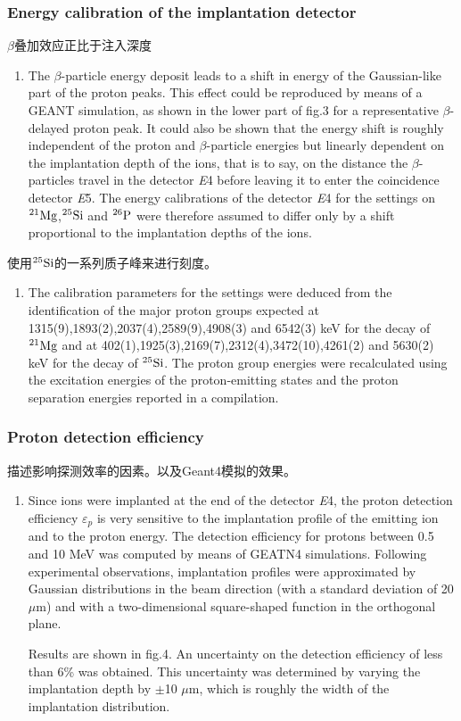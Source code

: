 \documentclass[UTF8]{ctexart}
\begin{document}
\subsubsection{Energy calibration of the implantation detector}
$\beta$叠加效应正比于注入深度
\begin{enumerate}
    \item The $\beta$-particle energy deposit leads to a shift in energy of the Gaussian-like part of the proton peaks. This effect could be reproduced by means of a GEANT simulation, as shown in the lower part of fig.3 for a representative $\beta$-delayed proton peak. It could also be shown that the energy shift is roughly independent of the proton and $\beta$-particle energies but linearly dependent on the implantation depth of the ions, that is to say, on the distance the $\beta$-particles travel in the detector \textit{E}4 before leaving it to enter the coincidence detector \textit{E}5. The energy calibrations of the detector \textit{E}4 for the settings on $^{21}\textnormal{Mg}$,$^{25}\textnormal{Si}$ and $^{26}\textnormal{P}$ were therefore assumed to differ only by a shift proportional to the implantation depths of the ions.
\end{enumerate}

使用$^{25}\textnormal{Si}$的一系列质子峰来进行刻度。
\begin{enumerate}
    \item The calibration parameters for the settings were deduced from the identification of the major proton groups expected at 1315(9),1893(2),2037(4),2589(9),4908(3) and 6542(3) keV for the decay of $^{21}\textnormal{Mg}$ and at 402(1),1925(3),2169(7),2312(4),3472(10),4261(2) and 5630(2) keV for the decay of $^{25}\textnormal{Si}$. The proton group energies were recalculated using the excitation energies of the proton-emitting states and the proton separation energies reported in a compilation.
\end{enumerate}

\subsubsection{Proton detection efficiency}
描述影响探测效率的因素。以及Geant4模拟的效果。

\begin{enumerate}
    \item Since ions were implanted at the end of the detector \textit{E}4, the proton detection efficiency $\varepsilon_{p}$ is very sensitive to the implantation profile of the emitting ion and to the proton energy. The detection efficiency for protons between 0.5 and 10 MeV was computed by means of GEATN4 simulations. Following experimental observations, implantation profiles were approximated by Gaussian distributions in the beam direction (with a standard deviation of 20 $\mu$m) and with a two-dimensional square-shaped function in the orthogonal plane. 
    
    Results are shown in fig.4. An uncertainty on the detection efficiency of less than 6\% was obtained. This uncertainty was determined by varying the implantation depth by $\pm$10 $\mu$m, which is roughly the width of the implantation distribution.
\end{enumerate}
\end{document}
